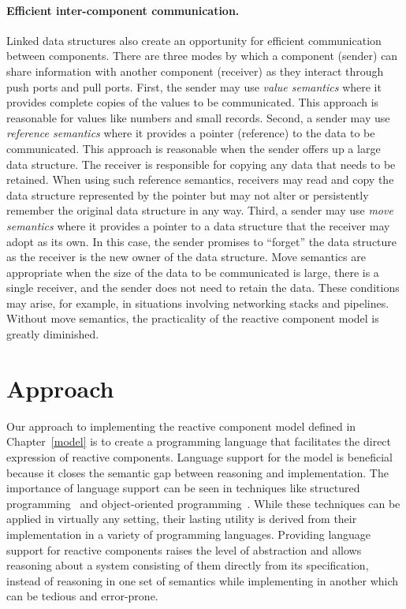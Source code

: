 \paragraph{Efficient inter-component communication.}
Linked data structures also create an opportunity for efficient communication between components.
There are three modes by which a component (sender) can share information with another component (receiver) as they interact through push ports and pull ports.
First, the sender may use \emph{value semantics} where it provides complete copies of the values to be communicated.
This approach is reasonable for values like numbers and small records.
Second, a sender may use \emph{reference semantics} where it provides a pointer (reference) to the data to be communicated.
This approach is reasonable when the sender offers up a large data structure.
The receiver is responsible for copying any data that needs to be retained.
When using such reference semantics, receivers may read and copy the data structure represented by the pointer but may not alter or persistently remember the original data structure in any way.
Third, a sender may use \emph{move semantics} where it provides a pointer to a data structure that the receiver may adopt as its own.
In this case, the sender promises to ``forget'' the data structure as the receiver is the new owner of the data structure.
Move semantics are appropriate when the size of the data to be communicated is large, there is a single receiver, and the sender does not need to retain the data.
These conditions may arise, for example, in situations involving networking stacks and pipelines.
Without move semantics, the practicality of the reactive component model is greatly diminished.

\section{Approach}

Our approach to implementing the reactive component model defined in Chapter~\ref{model} is to create a programming language that facilitates the direct expression of reactive components.
Language support for the model is beneficial because it closes the semantic gap between reasoning and implementation.
The importance of language support can be seen in techniques like structured programming~\cite{dahl1972structured} and object-oriented programming~\cite{booch1982object}.
While these techniques can be applied in virtually any setting, their lasting utility is derived from their implementation in a variety of programming languages.
Providing language support for reactive components raises the level of abstraction and allows reasoning about a system consisting of them directly from its specification, instead of reasoning in one set of semantics while implementing in another which can be tedious and error-prone.

